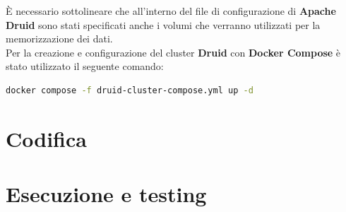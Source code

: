 \pagebreak
È necessario sottolineare che all'interno del file di configurazione di \textbf{Apache Druid} sono stati specificati anche i \gls{volumi}{} che verranno utilizzati per la memorizzazione dei dati.
\\Per la creazione e configurazione del \gls{cluster}{} \textbf{Druid} con \textbf{Docker Compose} è stato utilizzato il seguente comando:
\begin{lstlisting}[language=bash]
    docker compose -f druid-cluster-compose.yml up -d
\end{lstlisting}
\section{Codifica}

\section{Esecuzione e testing}

\newpage
\pagestyle{empty}
\null %
\newpage
